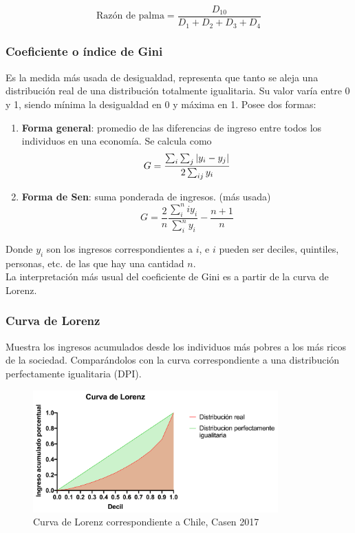 \[\text{Razón de palma} = \frac{D_{10}}{D_1+D_2+D_3+D_4}\]

\subsubsection{Coeficiente o índice de Gini}
Es la medida más usada de desigualdad, representa que tanto se aleja una distribución real de una distribución totalmente igualitaria. Su valor varía entre 0 y 1, siendo mínima la desigualdad en 0 y máxima en 1. Posee dos formas:

\begin{enumerate}[label=\roman*.]
    \item \textbf{Forma general}: promedio de las diferencias de ingreso entre todos los individuos en una economía. Se calcula como \newline
    \[G = \frac{\sum_i\sum_j\abs{y_i-y_j}}{2\sum_{ij}y_i}\]
    
    \item \textbf{Forma de Sen}: suma ponderada de ingresos. (más usada)
    \newline
    \[G = \frac{2}{n}\frac{\sum_i^n i y_i}{\sum_i^n y_i} - \frac{n+1}{n}\]
\end{enumerate}


Donde $y_i$ son los ingresos correspondientes a $i$, e $i$ pueden ser deciles, quintiles, personas, etc. de las que hay una cantidad $n$.
\\

La interpretación más usual del coeficiente de Gini es a partir de la curva de Lorenz.
\subsubsection{Curva de Lorenz}
Muestra los ingresos acumulados desde los individuos más pobres a los más ricos de la sociedad. Comparándolos con la curva correspondiente a una distribución perfectamente igualitaria (DPI).

\begin{figure}[H]
    \centering
    \includegraphics[width=0.84\textwidth]{Modulo_4/Curva_Lorenz_Final.png}
    \caption{Curva de Lorenz correspondiente a Chile, Casen 2017}
    \label{fig:lorenz_casen_2017}
\end{figure}

